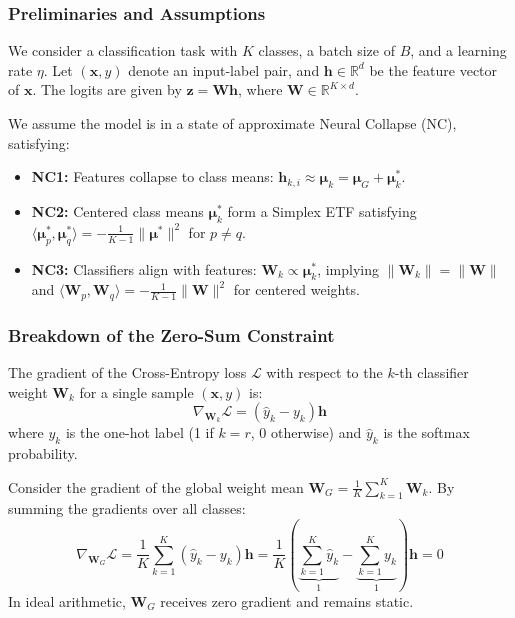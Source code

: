 \documentclass{article}
\theoremstyle{plain}
\theoremstyle{definition}
\theoremstyle{remark}
\begin{document}
\subsubsection{Preliminaries and Assumptions}
We consider a classification task with $K$ classes, a batch size of $B$, and a learning rate $\eta$. Let $(\bm{x}, y)$ denote an input-label pair, and $\bm{h} \in \mathbb{R}^d$ be the feature vector of $\bm{x}$. The logits are given by $\bm{z} = \bm{W}\bm{h}$, where $\bm{W} \in \mathbb{R}^{K \times d}$.

We assume the model is in a state of approximate Neural Collapse (NC), satisfying:
\begin{itemize}
    \item \textbf{NC1:} Features collapse to class means: $\bm{h}_{k,i} \approx \bm{\mu}_k = \bm{\mu}_G + \bm{\mu}_k^*$.
    \item \textbf{NC2:} Centered class means $\bm{\mu}_k^*$ form a Simplex ETF satisfying $\langle \bm{\mu}_p^*, \bm{\mu}_q^* \rangle = -\frac{1}{K-1}\|\bm{\mu}^*\|^2$ for $p \neq q$.
    \item \textbf{NC3:} Classifiers align with features: $\bm{W}_k \propto \bm{\mu}_k^*$, implying $\|\bm{W}_k\| = \|\bm{W}\|$ and $\langle \bm{W}_p, \bm{W}_q \rangle = -\frac{1}{K-1}\|\bm{W}\|^2$ for centered weights.
\end{itemize}

\subsubsection{Breakdown of the Zero-Sum Constraint}
The gradient of the Cross-Entropy loss $\mathcal{L}$ with respect to the $k$-th classifier weight $\bm{W}_k$ for a single sample $(\bm{x}, y)$ is:
\begin{equation}
    \nabla_{\bm{W}_k} \mathcal{L} = (\hat{y}_k - y_k) \bm{h}
\end{equation}
where $y_k$ is the one-hot label (1 if $k=r$, 0 otherwise) and $\hat{y}_k$ is the softmax probability.

Consider the gradient of the global weight mean $\bm{W}_G = \frac{1}{K}\sum_{k=1}^K \bm{W}_k$. By summing the gradients over all classes:
\begin{equation}
    \nabla_{\bm{W}_G} \mathcal{L} = \frac{1}{K} \sum_{k=1}^K (\hat{y}_k - y_k) \bm{h} = \frac{1}{K} \left( \underbrace{\sum_{k=1}^K \hat{y}_k}_{1} - \underbrace{\sum_{k=1}^K y_k}_{1} \right) \bm{h} = 0
\end{equation}
In ideal arithmetic, $\bm{W}_G$ receives zero gradient and remains static.
\end{document}
